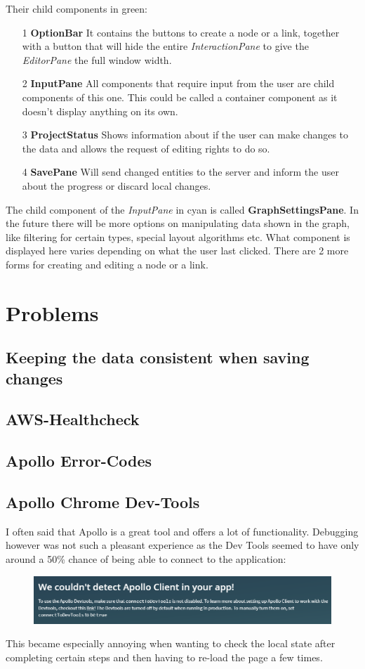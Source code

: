 Their child components in green:
\begin{itemize}
\item[1] \textbf{OptionBar} It contains the buttons to create a node or a link, together with a button that will hide the entire \emph{InteractionPane} to give the \emph{EditorPane} the full window width.
\item[2] \textbf{InputPane} All components that require input from the user are child components of this one. This could be called a container component as it doesn't display anything on its own.
\item[3] \textbf{ProjectStatus} Shows information about if the user can make changes to the data and allows the request of editing rights to do so.
\item[4] \textbf{SavePane} Will send changed entities to the server and inform the user about the progress or discard local changes.
\end{itemize}

The child component of the \emph{InputPane} in cyan is called \textbf{GraphSettingsPane}. In the future there will be more options on manipulating data shown in the graph, like filtering for certain types, special layout algorithms etc. What component is displayed here varies depending on what the user last clicked. There are 2 more forms for creating and editing a node or a link.

\section{Problems}
\subsection{Keeping the data consistent when saving changes}
\subsection{AWS-Healthcheck}
\subsection{Apollo Error-Codes}
\subsection{Apollo Chrome Dev-Tools}
I often said that Apollo is a great tool and offers a lot of functionality. Debugging however was not such a pleasant experience as the Dev Tools seemed to have only around a 50\% chance of being able to connect to the application:
\begin{figure}[H]
\centering
\includegraphics[scale=.65]{Bilder/ScreenOfDeath.png}
\end{figure}
This became especially annoying when wanting to check the local state after completing certain steps and then having to re-load the page a few times.

